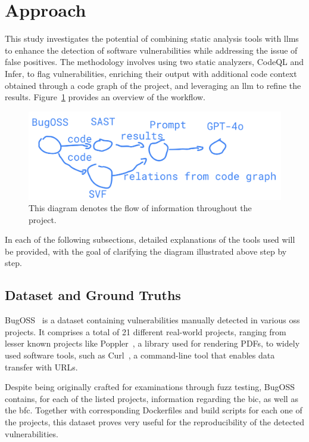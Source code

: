 \section{Approach}
\label{sec:approach}
This study investigates the potential of combining static analysis tools with \aclp{llm} to enhance the detection of software vulnerabilities while addressing the issue of false positives. 
The methodology involves using two static analyzers, CodeQL and Infer, to flag vulnerabilities, enriching their output with additional code context obtained through a code graph of the project, and leveraging an \ac{llm} to refine the results. 
Figure~\ref{fig1} provides an overview of the workflow.

\begin{figure}
\includegraphics[width=\textwidth]{figures/fig1-workflow.png}
\caption{This diagram denotes the flow of information throughout the project.} 
\label{fig1}
\end{figure}

In each of the following subsections, detailed explanations of the tools used will be provided, with the goal of clarifying the diagram illustrated above step by step.

\subsection{Dataset and Ground Truths}
\label{sec:approach:sub:dataset}
BugOSS~\cite{BugOSS} is a dataset containing vulnerabilities manually detected in various \acl{oss} projects.
It comprises a total of 21 different real-world projects, ranging from lesser known projects like Poppler~\cite{poppler}, a library used for rendering PDFs, to widely used software tools, such as Curl~\cite{curl}, a command-line tool that enables data transfer with URLs.

Despite being originally crafted for examinations through fuzz testing, BugOSS contains, for each of the listed projects, information regarding the \ac{bic}, as well as the \ac{bfc}. Together with corresponding Dockerfiles and build scripts for each one of the projects, this dataset proves very useful for the reproducibility of the detected vulnerabilities.

